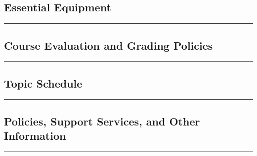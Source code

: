 \documentclass[11pt]{handout}
\begin{document}
 
\subsection*{Essential Equipment}

\vspace{2ex}\hrule\vspace{2ex}

   
\subsection*{Course Evaluation and Grading Policies} 

\vspace{2ex}\hrule\vspace{2ex}


\if{}
	{
	    \subsection*{Topic Schedule}
 	    
	     \vspace{2ex}\hrule\vspace{2ex}
	}
\fi


\if{}
	{
	    \subsection*{Policies, Support Services, and Other Information}
 	    
	     \vspace{2ex}\hrule\vspace{2ex}
	}
\fi
 
\end{document}
